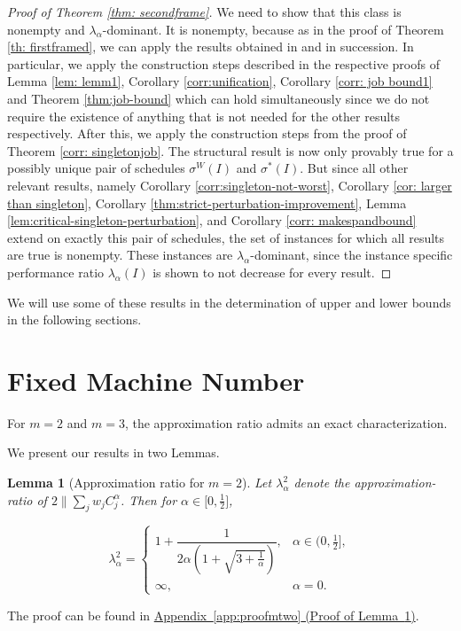 \documentclass[%
english, titlepage=false %
]{./tum-templates/book/tumbook}
\newtheorem{lemma}{Lemma}
\begin{document}
\begin{proof}[Proof of Theorem \ref{thm: secondframe}]
    We need to show that this class is nonempty and $\lambda_{\alpha}$-dominant.
    It is nonempty, because as in the proof of Theorem \ref{th: firstframed}, we can apply the results obtained in 
    and  in succession. 
    In particular, we apply the construction steps described in the respective proofs of Lemma \ref{lem: lemm1}, Corollary \ref{corr:unification}, Corollary \ref{corr: job bound1} and 
    Theorem \ref{thm:job-bound} which can hold simultaneously since we do not require the existence of anything that is not needed for the other results respectively. 
    After this, we apply the construction steps from the proof of Theorem \ref{corr: singletonjob}. The structural result is now only 
    provably true for a possibly unique pair of schedules $\sigma^W(I)$ and $\sigma^*(I)$. 
    But since all other relevant results, namely Corollary \ref{corr:singleton-not-worst}, Corollary \ref{cor: larger than singleton}, Corollary \ref{thm:strict-perturbation-improvement}, Lemma \ref{lem:critical-singleton-perturbation},
    and Corollary \ref{corr: makespandbound} extend on exactly this pair of 
    schedules, the set of instances for which all results are true is nonempty. 
    These instances are $\lambda_{\alpha}$-dominant, since the instance specific performance ratio $\lambda_{\alpha}(I)$ is shown
    to not decrease for every result. 
\end{proof}

We will use some of these results in the determination of upper and lower bounds in the following sections.

\section{Fixed Machine Number}\label{sec:FixedmachineNumber}
For \(m=2\) and \(m=3\), the approximation ratio admits an exact characterization.

We present our results in two Lemmas.

\begin{lemma}[Approximation ratio for $m=2$]\label{lem:mtwo}
    Let $\lambda^{2}_{\alpha}$ denote the approximation-ratio of $2\!\parallel\!\sum_{j} w_j C^{\alpha}_j$. Then for 
    $\alpha \in \Big[0,\frac12\Big]$,

   \[
\lambda^2_{\alpha}
=
\begin{cases}
1+\dfrac{1}{2\alpha\left(1+\sqrt{3+\frac{1}{\alpha}}\right)},
& \alpha\in \Big(0,\frac12\Big],\\[1.2ex]
\infty,
& \alpha=0.
\end{cases}
\]
\end{lemma}
The proof can be found in
\hyperlink{proof:mtwo}{Appendix~\ref*{app:proofmtwo}
(Proof of Lemma~\ref*{lem:mtwo})}.
\end{document}
